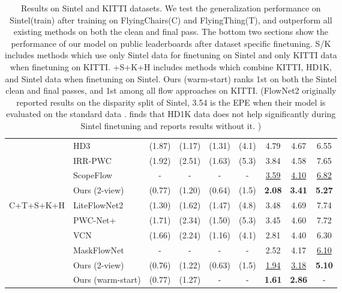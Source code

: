 \documentclass[runningheads]{llncs}
\begin{document}
\begin{table}[h]
{\begin{tabular}{clccccccc}
                     & HD3 \cite{hd3}         & (1.87)     & (1.17) & (1.31) & (4.1)  & 4.79  & 4.67 & 6.55 \\
                     & IRR-PWC \cite{irr}     & (1.92) & (2.51) & (1.63) & (5.3) & 3.84  & 4.58  & 7.65 \\
                     & ScopeFlow\cite{scopeflow} & - & - & - & - & \underline{3.59} & \underline{4.10} & \underline{6.82} \\
                     & Ours (2-view) & (0.77) & (1.20) & (0.64) & (1.5) & \textbf{2.08} & \textbf{3.41} & \textbf{5.27} \\ \midrule
\multirow{6}{*}{C+T+S+K+H}
                     & LiteFlowNet2 \cite{liteflownet2} & (1.30) & (1.62) & (1.47) & (4.8) & 3.48  & 4.69 & 7.74 \\
                     & PWC-Net+\cite{pwcnet+}   & (1.71)     & (2.34)  & (1.50) & (5.3)  & 3.45  & 4.60 & 7.72 \\
                     & VCN \cite{vcn}            & (1.66)     & (2.24) & (1.16) & (4.1) & 2.81  & 4.40 & 6.30 \\
                     & MaskFlowNet\cite{maskflownet} & - & - & - & - & 2.52 & 4.17 & \underline{6.10} \\
                     & Ours (2-view)       & (0.76)  & (1.22) & (0.63) & (1.5) & \underline{1.94} & \underline{3.18} & \textbf{5.10} \\ 
                     & Ours (warm-start) & (0.77) & (1.27) & - & - & \textbf{1.61} & \textbf{2.86}  & - \\
                     \bottomrule
\end{tabular}
}
\caption{Results on Sintel and KITTI datasets. We test the generalization performance on Sintel(train) after training on FlyingChairs(C) and FlyingThing(T), and outperform all existing methods on both the clean and final pass. The bottom two sections show the performance of our model on public leaderboards after dataset specific finetuning. S/K includes methods which use only Sintel data for finetuning on Sintel and only KITTI data when finetuning on KITTI. +S+K+H includes methods which combine KITTI, HD1K, and Sintel data when finetuning on Sintel. Ours (warm-start) ranks 1st on both the Sintel clean and final passes, and 1st among all flow approaches on KITTI.  (FlowNet2 originally reported results on the disparity split of Sintel, 3.54 is the EPE when their model is evaluated on the standard data \cite{liteflownet}.  \cite{liteflownet2} finds that HD1K data does not help significantly during Sintel finetuning and reports results without it. )}
\label{table:Results}
\end{table}
\end{document}
